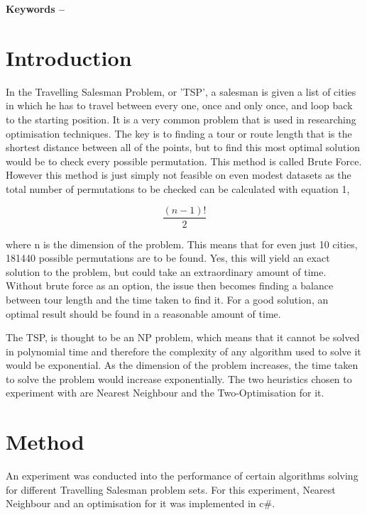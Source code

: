\documentclass[10pt, a4paper]{article}
\title{\mytitle}
\author{\myauthor\hspace{1em}\\\contact\\Edinburgh Napier University\hspace{0.5em}-\hspace{0.5em}\mymodule}
\date{}
\begin{document}
	\maketitle
    
	\textbf{Keywords -- }{\mykeywords}
    
	\section{Introduction}
	
	In the Travelling Salesman Problem, or 'TSP', a salesman is given a list of cities in which he has to travel between every one, once and only once, and loop back to the starting position. It is a very common problem that is used in researching optimisation techniques. The key is to finding a tour or route length that is the shortest distance between all of the points, but to find this most optimal solution would be to check every possible permutation. This method is called Brute Force.\cite{brute} However this method is just simply not feasible on even modest datasets as the total number of permutations to be checked can be calculated with equation 1,
	
	\begin{equation}
	\frac{(n-1)!}{2}
	\end{equation}
	
	where n is the dimension of the problem. This means that for even just 10 cities, 181440 possible permutations are to be found. Yes, this will yield an exact solution to the problem, but could take an extraordinary amount of time. Without brute force as an option, the issue then becomes finding a balance between tour length and the time taken to find it. For a good solution, an optimal result should be found in a reasonable amount of time.
	
	The TSP, is thought to be an NP problem, which means that it cannot be solved in polynomial time and therefore the complexity of any algorithm used to solve it would be exponential. \cite{np} As the dimension of the problem increases, the time taken to solve the problem would increase exponentially. The two heuristics chosen to experiment with are Nearest Neighbour and the Two-Optimisation for it.
		
	\section{Method}
	An experiment was conducted into the performance of certain algorithms solving for different Travelling Salesman problem sets. For this experiment, Nearest Neighbour and an optimisation for it was implemented in c$\#$. 
	
\end{document}

